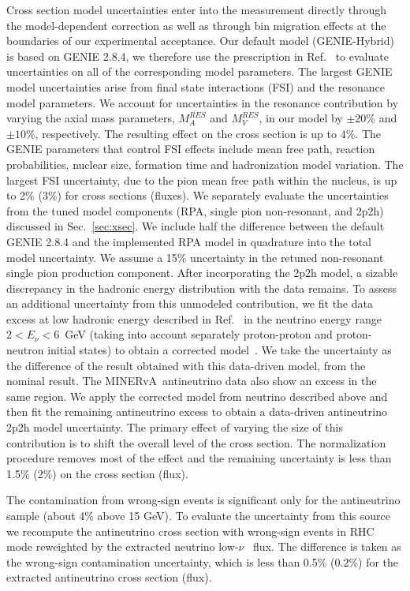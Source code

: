 \documentclass[aps,preprint,showpacs,superscriptaddress,linenumbers,nofootinbib,prd,12pt]{revtex4}
\newcommand{\minerva}{MINERvA\xspace}
\newcommand{\lownu}{low-$\nu$~}
\begin{document}
{Cross section model uncertainties enter into the measurement directly through the model-dependent correction as well as through bin migration effects at the boundaries of our experimental acceptance. Our default model (GENIE-Hybrid) is based on GENIE 2.8.4, we therefore use the prescription in Ref.~\cite{Andreopoulos:2015wxa} to evaluate uncertainties on all of the corresponding model parameters. The largest GENIE model uncertainties arise from final state interactions (FSI) and the resonance model parameters. We account for uncertainties in the resonance contribution by varying the axial mass parameters, $M^{RES}_A$ and $M^{RES}_V$, in our model by $\pm 20\%$ and $\pm 10\%$, respectively. The resulting effect on the cross section is up to $4\%$. 
The GENIE parameters that control FSI effects include mean free path, 
reaction probabilities, nuclear size, formation time and hadronization model variation.
The largest FSI uncertainty, due to the pion mean free path within the nucleus,  is up to 2\% (3\%) for cross sections (fluxes).
We separately evaluate the uncertainties from the tuned model components (RPA, single pion non-resonant, and 2p2h) discussed
in Sec.~\ref{sec:xsec}. We include half the difference between the default GENIE 2.8.4 and the implemented RPA model in quadrature into the total model uncertainty. We assume a 15\% uncertainty in the retuned non-resonant single pion production component. 
After incorporating the 2p2h model, a sizable discrepancy in the hadronic energy distribution with the data remains. To assess an additional uncertainty from this unmodeled contribution, we fit the data excess at low hadronic energy described in Ref.~\cite{Rodrigues:2015hik} in the neutrino energy range $2<E_{\nu}<6$~GeV (taking into account separately proton-proton and proton-neutron initial states) to obtain a corrected model~\cite{luren,ddref}. 
We take the  uncertainty as the difference of the result obtained with this data-driven model, from the nominal result. The \minerva\ antineutrino data also show an excess in the same region. We apply the corrected model from neutrino described above and then fit the remaining antineutrino excess to obtain a data-driven antineutrino 2p2h model uncertainty. The primary effect of varying the size of this contribution is to shift  the overall level of the cross section. The normalization procedure removes most of the effect and the remaining uncertainty is less than 1.5\% (2\%) on the cross section (flux).

The contamination from wrong-sign events is significant only for
the antineutrino sample (about 4\% above 15 GeV). To evaluate the uncertainty from this source we recompute the antineutrino cross section with wrong-sign 
events in RHC mode reweighted by the extracted neutrino \lownu{} flux. The difference is taken as the wrong-sign contamination uncertainty, 
which is less than 0.5\% ($0.2\%$) for the extracted antineutrino cross section (flux).

}
\end{document}

